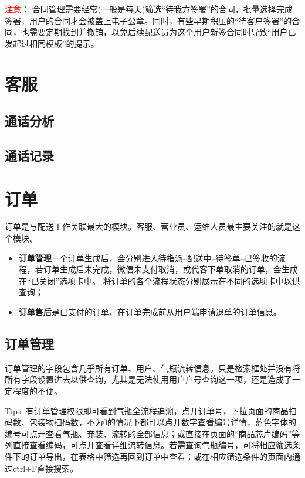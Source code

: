 \documentclass[UTF8]{ctexart}
\begin{document}
\textcolor{red}{注意}：
合同管理需要经常(一般是每天)筛选“待我方签署”的合同，批量选择完成签署，用户的合同才会被盖上电子公章。同时，有些早期积压的“待客户签署”的合同，也需要定期找到并撤销，以免后续配送员为这个用户新签合同时导致“用户已发起过相同模板”的提示。



\section{客服}

\subsection{通话分析}


\subsection{通话记录}


\section{订单}

订单是与配送工作关联最大的模块。客服、营业员、运维人员最主要关注的就是这个模块。
\begin{itemize}
	\item \textbf{订单管理}一个订单生成后，会分别进入待指派--配送中--待签单--已签收的流程，若订单生成后未完成，微信未支付取消，或代客下单取消的订单，会生成在“已关闭”选项卡中。
将订单的各个流程状态分别展示在不同的选项卡中以供查询；
    \item \textbf{订单售后}是已支付的订单，在订单完成前从用户端申请退单的订单信息。
\end{itemize}
\subsection{订单管理}

订单管理的字段包含几乎所有订单、用户、气瓶流转信息。只是检索框处并没有将所有字段设置进去以供查询，尤其是无法使用用户户号查询这一项，还是造成了一定程度的不便。

Tips: 有订单管理权限即可看到气瓶全流程追溯，点开订单号，下拉页面的商品扫码数、包装物扫码数，不为0的情况下都可以点开数字查看编号详情，蓝色字体的编号可点开查看气瓶、充装、流转的全部信息；或直接在页面的“商品芯片编码”等列直接查看编码，可点开查看详细流转信息。若需查询气瓶编号，可将相应筛选条件下的订单导出，在表格中筛选再回到订单中查看；或在相应筛选条件的页面内通过ctrl+F直接搜索。
\end{document}
